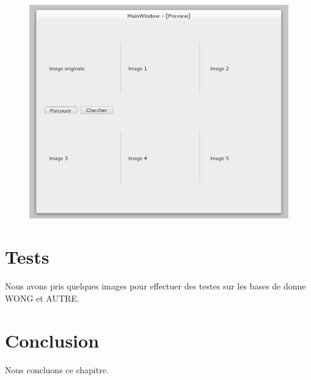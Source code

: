 \begin{figure}[H]
	\centering
		\includegraphics[width=5in]{Figures/search.png}
	\caption[]{}
	\label{fig:Electron}
\end{figure}

\section{Tests}

Nous avons pris quelques images pour effectuer des testes sur les bases de donne WONG et AUTRE.

\section{Conclusion}

Nous concluons ce chapitre.
